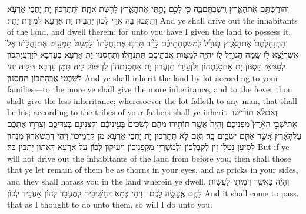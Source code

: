 {וְהוֹרַשְׁתֶּ֥ם אֶת\maqqaf הָאָ֖רֶץ וִֽישַׁבְתֶּם\maqqaf בָּ֑הּ כִּ֥י לָכֶ֛ם נָתַ֥תִּי אֶת\maqqaf הָאָ֖רֶץ לָרֶ֥שֶׁת אֹתָֽהּ׃}
{וּתְתָרְכוּן יָת יָתְבֵי אַרְעָא וְתִתְּבוּן בַּהּ אֲרֵי לְכוֹן יְהַבִית יָת אַרְעָא לְמֵירַת יָתַהּ׃}
{And ye shall drive out the inhabitants of the land, and dwell therein; for unto you have I given the land to possess it.}{}
{וְהִתְנַחַלְתֶּם֩ אֶת\maqqaf הָאָ֨רֶץ בְּגוֹרָ֜ל לְמִשְׁפְּחֹֽתֵיכֶ֗ם לָרַ֞ב תַּרְבּ֤וּ אֶת\maqqaf נַחֲלָתוֹ֙ וְלַמְעַט֙ תַּמְעִ֣יט אֶת\maqqaf נַחֲלָת֔וֹ אֶל֩ אֲשֶׁר\maqqaf יֵ֨צֵא ל֥וֹ שָׁ֛מָּה הַגּוֹרָ֖ל ל֣וֹ יִהְיֶ֑ה לְמַטּ֥וֹת אֲבֹתֵיכֶ֖ם תִּתְנֶחָֽלוּ׃}
{וְתַחְסְנוּן יָת אַרְעָא בְּעַדְבָּא לְזַרְעֲיָתְכוֹן לְסַגִּיאֵי תַּסְגּוֹן יָת אַחְסָנַתְהוֹן וְלִזְעֵירֵי תַּזְעֲרוּן יָת אַחְסָנַתְהוֹן לִדְיִפּוֹק לֵיהּ תַּמָּן עַדְבָּא דִּילֵיהּ יְהֵי לְשִׁבְטֵי אֲבָהָתְכוֹן תַּחְסְנוּן׃}
{And ye shall inherit the land by lot according to your families—to the more ye shall give the more inheritance, and to the fewer thou shalt give the less inheritance; wheresoever the lot falleth to any man, that shall be his; according to the tribes of your fathers shall ye inherit.}{}
{וְאִם\maqqaf לֹ֨א תוֹרִ֜ישׁוּ אֶת\maqqaf יֹשְׁבֵ֣י הָאָ֘רֶץ֮ מִפְּנֵיכֶם֒ וְהָיָה֙ אֲשֶׁ֣ר תּוֹתִ֣ירוּ מֵהֶ֔ם לְשִׂכִּים֙ בְּעֵ֣ינֵיכֶ֔ם וְלִצְנִינִ֖ם בְּצִדֵּיכֶ֑ם וְצָרְר֣וּ אֶתְכֶ֔ם עַל\maqqaf הָאָ֕רֶץ אֲשֶׁ֥ר אַתֶּ֖ם יֹשְׁבִ֥ים בָּֽהּ׃}
{וְאִם לָא תְתָרְכוּן יָת יָתְבֵי אַרְעָא מִן קֳדָמֵיכוֹן וִיהֵי דְּתַשְׁאֲרוּן מִנְּהוֹן לְסִיעָן נָטְלָן זֵין לְקִבְלְכוֹן וּלְמַשְׁרְיָן מַקְּפָנֵיכוֹן וִיעִיקוּן לְכוֹן עַל אַרְעָא דְּאַתּוּן יָתְבִין בַּהּ׃}
{But if ye will not drive out the inhabitants of the land from before you, then shall those that ye let remain of them be as thorns in your eyes, and as pricks in your sides, and they shall harass you in the land wherein ye dwell.}{}
{וְהָיָ֗ה כַּאֲשֶׁ֥ר דִּמִּ֛יתִי לַעֲשׂ֥וֹת לָהֶ֖ם אֶֽעֱשֶׂ֥ה לָכֶֽם׃ \petucha }
{וִיהֵי כְּמָא דְּחַשֵּׁיבִית לְמֶעֱבַד לְהוֹן אַעֲבֵיד לְכוֹן׃}
{And it shall come to pass, that as I thought to do unto them, so will I do unto you.}{}

